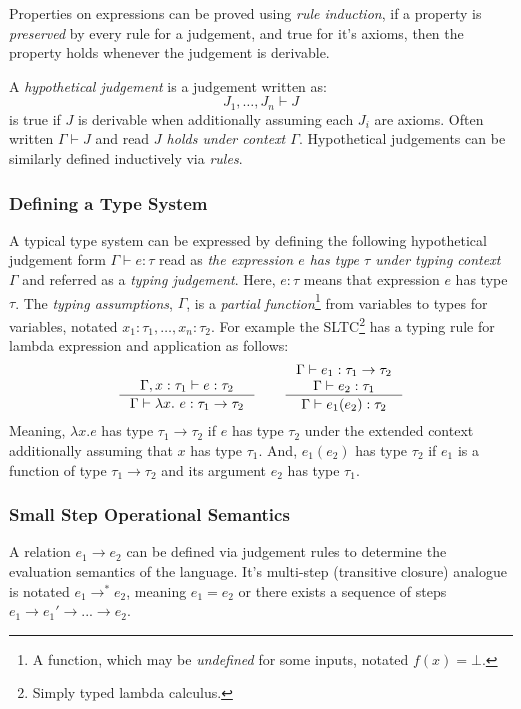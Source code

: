 Properties on expressions can be proved using \textit{rule induction}, if a property is \textit{preserved} by every rule for a judgement, and true for it's axioms, then the property holds whenever the judgement is derivable.

A \textit{hypothetical judgement} is a judgement written as: 
\[J_1, \dots, J_n \vdash J\]
is true if $J$ is derivable when additionally assuming each $J_i$ are axioms. Often written $\Gamma \vdash J$ and read \textit{$J$ holds under context $\Gamma$}. Hypothetical judgements can be similarly defined inductively via \textit{rules}.

\subsubsection{Defining a Type System}\label{sec:TypingJudgements}
A typical type system can be expressed by defining the following hypothetical judgement form $\Gamma \vdash e : \tau$ read as \textit{the expression $e$ has type $\tau$ under typing context $\Gamma$} and referred as a \textit{typing judgement}. Here, $e : \tau$ means that expression $e$ has type $\tau$.  The \textit{typing assumptions}, $\Gamma$, is a \textit{partial function}\footnote{A function, which may be \textit{undefined} for some inputs, notated $f(x) = \bot$.} from variables to types for variables, notated $x_1 : \tau_1, \dots, x_n : \tau_2$. For example the SLTC\footnote{Simply typed lambda calculus.} \cite[ch. 9]{TAPL} has a typing rule for lambda expression and application as follows:
\[\inference{\Gamma, x : \tau_1 \vdash e : \tau_2}{\Gamma \vdash \lambda x.\ e : \tau_1 \to \tau_2} \qquad \inference{\Gamma \vdash e_1 : \tau_1 \to \tau_2\\ \Gamma \vdash e_2 : \tau_1}{\Gamma \vdash e_1(e_2) : \tau_2}\]
Meaning, $\lambda x. e$ has type $\tau_1 \to \tau_2$ if $e$ has type $\tau_2$ under the extended context additionally assuming that $x$ has type $\tau_1$.
And, $e_1(e_2)$ has type $\tau_2$ if $e_1$ is a function of type $\tau_1 \to \tau_2$ and its argument $e_2$ has type $\tau_1$.

\subsubsection{Small Step Operational Semantics}
A relation $e_1 \to e_2$ can be defined via judgement rules to determine the evaluation semantics of the language. It's multi-step (transitive closure) analogue is notated $e_1 \to^{*} e_2$, meaning $e_1 = e_2$ or there exists a sequence of steps $e_1 \to e_1' \to ... \to e_2$.

